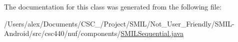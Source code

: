 The documentation for this class was generated from the following file\-:\begin{DoxyCompactItemize}
\item 
/\-Users/alex/\-Documents/\-C\-S\-C\-\_/\-Project/\-S\-M\-I\-L/\-Not\-\_\-\-User\-\_\-\-Friendly/\-S\-M\-I\-L-\/\-Android/src/csc440/nuf/components/\hyperlink{_s_m_i_l_sequential_8java}{S\-M\-I\-L\-Sequential.\-java}\end{DoxyCompactItemize}
